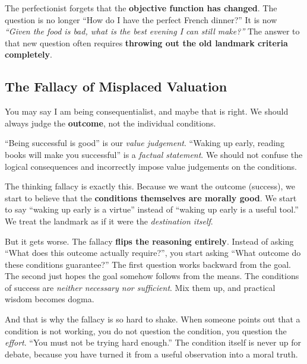 \documentclass[11pt]{article}
\begin{document}
The perfectionist forgets that the \textbf{objective function has changed}. The question is no longer ``How do I have the perfect French dinner?'' It is now \textit{``Given the food is bad, what is the best evening I can still make?''} The answer to that new question often requires \textbf{throwing out the old landmark criteria completely}.

\subsection{The Fallacy of Misplaced Valuation}

You may say I am being consequentialist, and maybe that is right. We should always judge the \textbf{outcome}, not the individual conditions.

``Being successful is good'' is our \textit{value judgement}. ``Waking up early, reading books will make you successful'' is a \textit{factual statement}. We should not confuse the logical consequences and incorrectly impose value judgements on the conditions.

The thinking fallacy is exactly this. Because we want the outcome (success), we start to believe that the \textbf{conditions themselves are morally good}. We start to say ``waking up early is a virtue'' instead of ``waking up early is a useful tool.'' We treat the landmark as if it were the \textit{destination itself}.

But it gets worse. The fallacy \textbf{flips the reasoning entirely}. Instead of asking ``What does this outcome actually require?'', you start asking ``What outcome do these conditions guarantee?'' The first question works backward from the goal. The second just hopes the goal somehow follows from the means. The conditions of success are \textit{neither necessary nor sufficient}. Mix them up, and practical wisdom becomes dogma.

And that is why the fallacy is so hard to shake. When someone points out that a condition is not working, you do not question the condition, you question the \textit{effort}. ``You must not be trying hard enough.'' The condition itself is never up for debate, because you have turned it from a useful observation into a moral truth.
\end{document}
